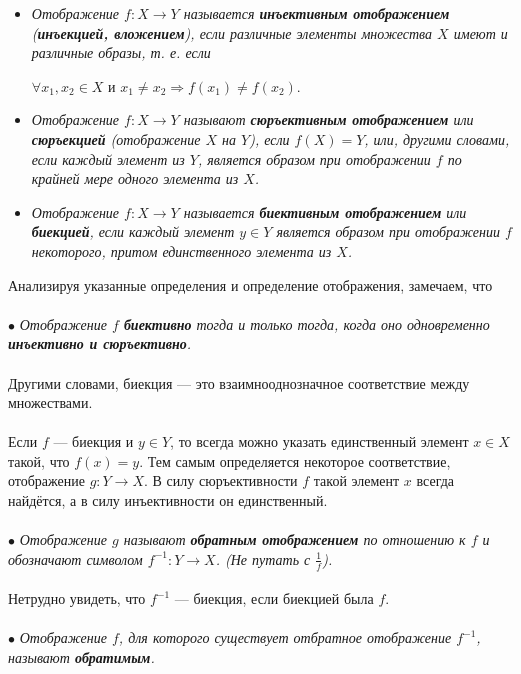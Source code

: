 \begin{itemize}
	\item \textit{Отображение $f:X \rightarrow Y$ называется \textbf{инъективным отображением} (\textbf{инъекцией, вложением}), если различные элементы множества $X$ имеют и различные образы, т. е. если}
	\begin{center}
		$\forall x_1, x_2 \in X$ и $x_1 \neq x_2 \Rightarrow f(x_1) \neq f(x_2)$.
	\end{center}
	\item \textit{Отображение $f: X \rightarrow Y$ называют \textbf{сюръективным отображением} или \textbf{сюръекцией} (отображение $X$ на $Y$), если $f(X)=Y$, или, другими словами, если каждый элемент из $Y$, является образом при отображении $f$ по крайней мере одного элемента из $X$.
	}
	\item \textit{
		Отображение $f: X \rightarrow Y$ называется \textbf{биективным отображением} или \textbf{биекцией}, если каждый элемент $y \in Y$ является образом при отображении $f$ некоторого, притом единственного элемента из $X$.
	}
\end{itemize}
Анализируя указанные определения и определение отображения, замечаем, что\\\\
$\bullet$ \textit{Отображение $f$ \textbf{биективно} тогда и только тогда, когда оно одновременно \textbf{инъективно и сюръективно}.}\\\\
Другими словами, биекция --- это взаимнооднозначное соответствие между множествами.\\\\
Если $f$ --- биекция и $y \in Y$, то всегда можно указать единственный элемент $x \in X$ такой, что $f(x)=y$. Тем самым определяется некоторое соответствие, отображение $g:Y \rightarrow X$. В силу сюръективности $f$ такой элемент $x$ всегда найдётся, а в силу инъективности он единственный.\\\\
$\bullet$ \textit{Отображение $g$ называют \textbf{обратным отображением} по отношению к $f$ и обозначают символом $f^{-1} : Y \rightarrow X$. (Не путать с $\frac{1}{f}$).}\\\\
Нетрудно увидеть, что $f^{-1}$ --- биекция, если биекцией была $f$.\\\\
$\bullet$ \textit{Отображение $f$, для которого существует отбратное отображение $f^{-1}$, называют \textbf{обратимым}.}\\\\
